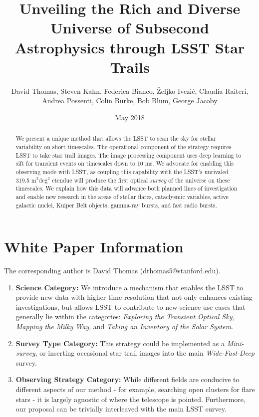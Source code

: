 \documentclass[12pt, letterpaper]{article}
\title{Unveiling the Rich and Diverse Universe of Subsecond Astrophysics through LSST Star Trails}
\author{David Thomas, Steven Kahn, Federica Bianco, Željko Ivezić, Claudia Raiteri, \\Andrea Possenti, Colin Burke, Bob Blum, George Jacoby}
\date{May 2018}
\begin{document}
\maketitle

\begin{abstract}
We present a unique method that allows the LSST to scan the sky for stellar variability on short timescales.
The operational component of the strategy requires LSST to take star trail images. The image processing component uses deep learning to sift for transient events on timescales down to 10 ms. We advocate for enabling this observing mode with LSST, as coupling this capability with the LSST's unrivaled 319.5 m$^2$deg$^2$ etendue will produce the first optical \textit{survey} of the universe on these timescales. We explain how this data will advance both planned lines of investigation and enable new research in the areas of stellar flares, cataclysmic variables, active galactic nuclei, Kuiper Belt objects, gamma-ray bursts, and fast radio bursts.
\end{abstract}

\section{White Paper Information}
The corresponding author is David Thomas (dthomas5@stanford.edu).

\begin{enumerate} 
\item {\bf Science Category:} We introduce a mechanism that enables the LSST to provide new data with higher time resolution that not only enhances existing investigations, but allows LSST to contribute to new science use cases that generally lie within the categories: \textit{Exploring the Transient Optical Sky}, \textit{Mapping the Milky Way}, and \textit{Taking an Inventory of the Solar System}.

\item {\bf Survey Type Category:} This strategy could be implemented as a \emph{Mini-survey}, or inserting occasional star trail images into the main \textit{Wide-Fast-Deep} survey.

\item {\bf Observing Strategy Category:}
While different fields are conducive to different aspects of our method - for example, searching open clusters for flare stars - it is largely agnostic of where the telescope is pointed. Furthermore, our proposal can be trivially interleaved with the main LSST survey.

\end{enumerate}  
\end{document}
